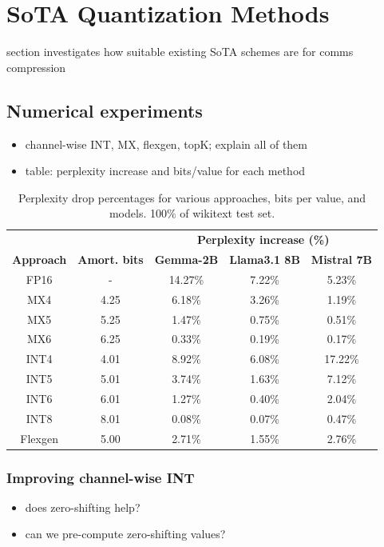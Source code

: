 
\chapter{SoTA Quantization Methods}
section investigates how suitable existing SoTA schemes are for comms compression

\section{Numerical experiments}
\begin{itemize}
	\item channel-wise INT, MX, flexgen, topK; explain all of them
    \item table: perplexity increase and bits/value for each method
\end{itemize}

\begin{table}[ht]
\centering
\begin{tabular}{ccccc}
\toprule
 & & \multicolumn{3}{c}{\textbf{Perplexity increase (\%)}}\\

\textbf{Approach} & \textbf{Amort. bits} & \textbf{Gemma-2B} & \textbf{Llama3.1 8B} & \textbf{Mistral 7B} \\
\hline
FP16    & -      & 14.27\%  & 7.22\%  & 5.23\%  \\
\hline
MX4     & 4.25   & 6.18\%   & 3.26\%  & 1.19\%  \\
MX5     & 5.25   & 1.47\%   & 0.75\%  & 0.51\%  \\
MX6     & 6.25   & 0.33\%   & 0.19\%  & 0.17\%  \\
\hline
INT4     & 4.01  & 8.92\%   & 6.08\%  & 17.22\% \\
INT5     & 5.01  & 3.74\%   & 1.63\%  & 7.12\%  \\
INT6     & 6.01  & 1.27\%   & 0.40\%  & 2.04\%  \\
INT8     & 8.01  & 0.08\%   & 0.07\%  & 0.47\%  \\
\hline
Flexgen & 5.00      & 2.71\%   & 1.55\%  & 2.76\%  \\
\bottomrule
\end{tabular}
\caption{Perplexity drop percentages for various approaches, bits per value, and models. 100\% of wikitext test set.}
\end{table}


\subsection{Improving channel-wise INT}
\begin{itemize}
    \item does zero-shifting help?
    \item can we pre-compute zero-shifting values?
\end{itemize}

